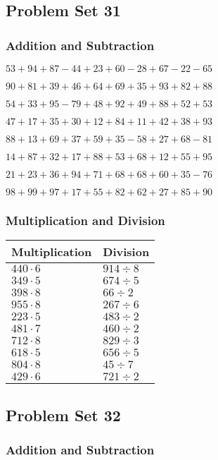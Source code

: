\hypertarget{problem-set-31}{%
\subsection{Problem Set 31}\label{problem-set-31}}

\hypertarget{addition-and-subtraction-30}{%
\subsubsection{Addition and
Subtraction}\label{addition-and-subtraction-30}}

\(53+94+87-44+23+60-28+67-22-65\)

\(90+81+39+46+64+69+35+93+82+88\)

\(54+33+95-79+48+92+49+88+52+53\)

\(47+17+35+30+12+84+11+42+38+93\)

\(88+13+69+37+59+35-58+27+68-81\)

\(14+87+32+17+88+53+68+12+55+95\)

\(21+23+36+94+71+68+68+60+35-76\)

\(98+99+97+17+55+82+62+27+85+90\)

\hypertarget{multiplication-and-division-30}{%
\subsubsection{Multiplication and
Division}\label{multiplication-and-division-30}}

\begin{longtable}[]{@{}ll@{}}
\toprule
Multiplication & Division\tabularnewline
\midrule
\endhead
\(440\cdot6\) & \(914÷8\)\tabularnewline
\(349\cdot5\) & \(674÷5\)\tabularnewline
\(398\cdot8\) & \(66÷2\)\tabularnewline
\(955\cdot8\) & \(267÷6\)\tabularnewline
\(223\cdot5\) & \(483÷2\)\tabularnewline
\(481\cdot7\) & \(460÷2\)\tabularnewline
\(712\cdot8\) & \(829÷3\)\tabularnewline
\(618\cdot5\) & \(656÷5\)\tabularnewline
\(804\cdot8\) & \(45÷7\)\tabularnewline
\(429\cdot6\) & \(721÷2\)\tabularnewline
\bottomrule
\end{longtable}

\hypertarget{problem-set-32}{%
\subsection{Problem Set 32}\label{problem-set-32}}

\hypertarget{addition-and-subtraction-31}{%
\subsubsection{Addition and
Subtraction}\label{addition-and-subtraction-31}}

